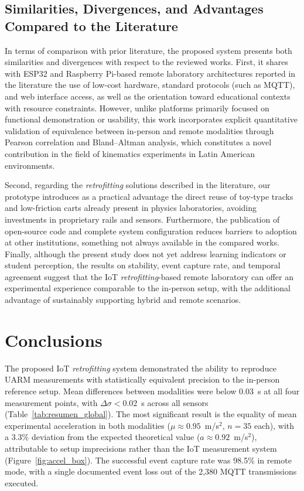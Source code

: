 \documentclass[sensors,article,submit,pdftex]{Definitions/mdpi}
\begin{document}
\subsection{Similarities, Divergences, and Advantages Compared to the Literature}

In terms of comparison with prior literature, the proposed system presents both similarities and divergences with respect to the reviewed works. First, it shares with ESP32 and Raspberry Pi-based remote laboratory architectures reported in the literature the use of low-cost hardware, standard protocols (such as MQTT), and web interface access, as well as the orientation toward educational contexts with resource constraints. However, unlike platforms primarily focused on functional demonstration or usability, this work incorporates explicit quantitative validation of equivalence between in-person and remote modalities through Pearson correlation and Bland--Altman analysis, which constitutes a novel contribution in the field of kinematics experiments in Latin American environments.

Second, regarding the \textit{retrofitting} solutions described in the literature, our prototype introduces as a practical advantage the direct reuse of toy-type tracks and low-friction carts already present in physics laboratories, avoiding investments in proprietary rails and sensors. Furthermore, the publication of open-source code and complete system configuration reduces barriers to adoption at other institutions, something not always available in the compared works. Finally, although the present study does not yet address learning indicators or student perception, the results on stability, event capture rate, and temporal agreement suggest that the IoT \textit{retrofitting}-based remote laboratory can offer an experimental experience comparable to the in-person setup, with the additional advantage of sustainably supporting hybrid and remote scenarios.

\section{Conclusions}

The proposed IoT \textit{retrofitting} system demonstrated the ability to reproduce UARM measurements with statistically equivalent precision to the in-person reference setup. Mean differences between modalities were below 0.03~s at all four measurement points, with $\Delta\sigma < 0.02$~s across all sensors (Table~\ref{tab:resumen_global}). The most significant result is the equality of mean experimental acceleration in both modalities ($\mu \approx 0.95$~m/s$^2$, $n = 35$ each), with a 3.3\% deviation from the expected theoretical value ($a \approx 0.92$~m/s$^2$), attributable to setup imprecisions rather than the IoT measurement system (Figure~\ref{fig:accel_box}). The successful event capture rate was 98.5\% in remote mode, with a single documented event loss out of the 2,380 MQTT transmissions executed.
\end{document}
